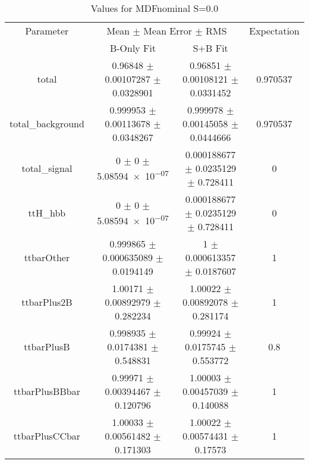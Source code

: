 \begin{table}
\centering
\caption{Values for MDFnominal S=0.0}
\begin{tabular}{cccc}
\toprule
Parameter & \multicolumn{2}{c}{Mean $\pm$ Mean Error $\pm$ RMS} & Expectation\\
 & B-Only Fit & S+B Fit & \\
\midrule
total & \num{0.96848} $\pm$ \num{0.00107287} $\pm$ \num{0.0328901} & \num{0.96851} $\pm$ \num{0.00108121} $\pm$ \num{0.0331452} & \num{0.970537}\\
total\_background & \num{0.999953} $\pm$ \num{0.00113678} $\pm$ \num{0.0348267} & \num{0.999978} $\pm$ \num{0.00145058} $\pm$ \num{0.0444666} & \num{0.970537}\\
total\_signal & \num{0} $\pm$ \num{0} $\pm$ \num{5.08594e-07} & \num{0.000188677} $\pm$ \num{0.0235129} $\pm$ \num{0.728411} & \num{0}\\
ttH\_hbb & \num{0} $\pm$ \num{0} $\pm$ \num{5.08594e-07} & \num{0.000188677} $\pm$ \num{0.0235129} $\pm$ \num{0.728411} & \num{0}\\
ttbarOther & \num{0.999865} $\pm$ \num{0.000635089} $\pm$ \num{0.0194149} & \num{1} $\pm$ \num{0.000613357} $\pm$ \num{0.0187607} & \num{1}\\
ttbarPlus2B & \num{1.00171} $\pm$ \num{0.00892979} $\pm$ \num{0.282234} & \num{1.00022} $\pm$ \num{0.00892078} $\pm$ \num{0.281174} & \num{1}\\
ttbarPlusB & \num{0.998935} $\pm$ \num{0.0174381} $\pm$ \num{0.548831} & \num{0.99924} $\pm$ \num{0.0175745} $\pm$ \num{0.553772} & \num{0.8}\\
ttbarPlusBBbar & \num{0.99971} $\pm$ \num{0.00394467} $\pm$ \num{0.120796} & \num{1.00003} $\pm$ \num{0.00457039} $\pm$ \num{0.140088} & \num{1}\\
ttbarPlusCCbar & \num{1.00033} $\pm$ \num{0.00561482} $\pm$ \num{0.171303} & \num{1.00022} $\pm$ \num{0.00574431} $\pm$ \num{0.17573} & \num{1}\\
\bottomrule
\end{tabular}
\end{table}